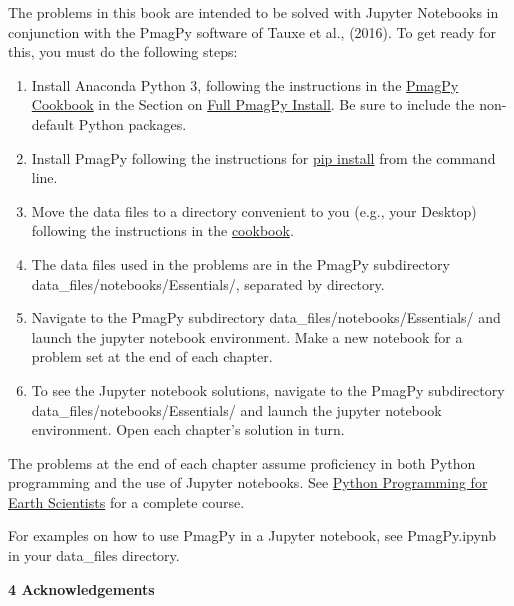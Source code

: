 The problems in this book are intended to be solved with Jupyter Notebooks in conjunction with the PmagPy software of \nocite{tauxe16} Tauxe et al., (2016).  To  get ready for this, you must do the following steps:

\begin{enumerate}
\item Install Anaconda Python 3, following the instructions in the  \href{http://earthref.org/PmagPy} {PmagPy Cookbook} in the Section on  \href{http://earthref.org/PmagPy/cookbook/#getting_python}{ Full PmagPy Install}.  Be sure to include the non-default Python packages. 
\item Install PmagPy following the instructions for \href{http://earthref.org/PmagPy/cookbook/#pip_install}{pip install} from the command line.   
\item  Move the data files to a directory convenient to you (e.g., your Desktop) following the instructions in the \href{http://earthref.org/PmagPy/cookbook/#move_data_files}{cookbook}.  
\item The data files used in the problems are in the PmagPy subdirectory data\_files/notebooks/Essentials/, separated by directory.  
\item Navigate to the PmagPy subdirectory data\_files/notebooks/Essentials/ and launch the jupyter notebook environment. Make a new notebook for a problem set at the end of each chapter. 
\item To see the Jupyter notebook solutions, navigate to the PmagPy subdirectory data\_files/notebooks/Essentials/ and launch the jupyter notebook environment.  Open each chapter's solution in turn. 
\end{enumerate}


The problems at the end of each chapter assume proficiency in both Python programming and the use of Jupyter notebooks.   See \href{https://nbviewer.jupyter.org/github/ltauxe/Python-for-Earth-Science-Students/blob/master/Lecture_01_syllabus.ipynb}{Python Programming  for Earth Scientists} for a complete course.   

For examples on how to use PmagPy in a Jupyter notebook, see PmagPy.ipynb in your data\_files directory.   





\noindent
{\bf 4 Acknowledgements}
  
